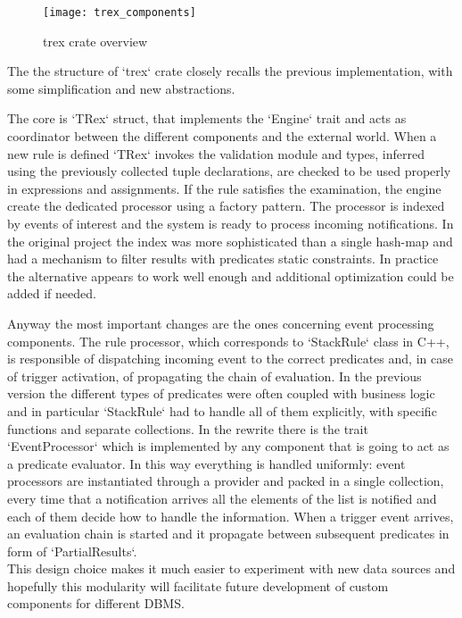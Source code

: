 \begin{figure}[h]
  \centering
  \texttt{[image: trex\_components]}
  \caption{trex crate overview}
\end{figure}

The the structure of `trex` crate closely recalls the previous implementation, with some simplification and new abstractions.

The core is `TRex` struct, that implements the `Engine` trait and acts as coordinator between the different components and the external world. When a new rule is defined `TRex` invokes the validation module and types, inferred using the previously collected tuple declarations, are checked to be used properly in expressions and assignments. If the rule satisfies the examination, the engine create the dedicated processor using a factory pattern. The processor is indexed by events of interest and the system is ready to process incoming notifications. In the original project the index was more sophisticated than a single hash-map and had a mechanism to filter results with predicates static constraints. In practice the alternative appears to work well enough and additional optimization could be added if needed.

Anyway the most important changes are the ones concerning event processing components. The rule processor, which corresponds to `StackRule` class in C++, is responsible of dispatching incoming event to the correct predicates and, in case of trigger activation, of propagating the chain of evaluation. In the previous version the different types of predicates were often coupled with business logic and in particular `StackRule` had to handle all of them explicitly, with specific functions and separate collections. In the rewrite there is the trait `EventProcessor` which is implemented by any component that is going to act as a predicate evaluator. In this way everything is handled uniformly: event processors are instantiated through a provider and packed in a single collection, every time that a notification arrives all the elements of the list is notified and each of them decide how to handle the information. When a trigger event arrives, an evaluation chain is started and it propagate between subsequent predicates in form of `PartialResults`.\\
This design choice makes it much easier to experiment with new data sources and hopefully this modularity will facilitate future development of custom components for different DBMS.

